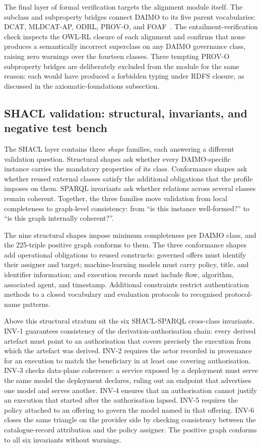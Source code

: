 \documentclass[Afour,sagev,times]{sagej}
\begin{document}
The final layer of formal verification targets the alignment module itself. The subclass and subproperty bridges connect DAIMO to its five parent vocabularies: DCAT, MLDCAT-AP, ODRL, PROV-O, and FOAF~\cite{foaf}. The entailment-verification check inspects the OWL-RL closure of each alignment and confirms that none produces a semantically incorrect superclass on any DAIMO governance class, raising zero warnings over the fourteen classes. Three tempting PROV-O subproperty bridges are deliberately excluded from the module for the same reason: each would have produced a forbidden typing under RDFS closure, as discussed in the axiomatic-foundations subsection.

\subsection{SHACL validation: structural, invariants, and negative test bench}\label{sec:eval-invariants}

The SHACL layer contains three \emph{shape} families, each answering a different validation question. Structural shapes ask whether every DAIMO-specific instance carries the mandatory properties of its class. Conformance shapes ask whether reused external classes satisfy the additional obligations that the profile imposes on them. SPARQL invariants ask whether relations across several classes remain coherent. Together, the three families move validation from local completeness to graph-level consistency: from ``is this instance well-formed?'' to ``is this graph internally coherent?''.

The nine structural shapes impose minimum completeness per DAIMO class, and the 225-triple positive graph conforms to them. The three conformance shapes add operational obligations to reused constructs: governed offers must identify their assigner and target; machine-learning models must carry policy, title, and identifier information; and execution records must include flow, algorithm, associated agent, and timestamp. Additional constraints restrict authentication methods to a closed vocabulary and evaluation protocols to recognised protocol-name patterns.

Above this structural stratum sit the six SHACL-SPARQL cross-class invariants. INV-1 guarantees consistency of the derivation-authorisation chain: every derived artefact must point to an authorisation that covers precisely the execution from which the artefact was derived. INV-2 requires the actor recorded in provenance for an execution to match the beneficiary in at least one covering authorisation. INV-3 checks data-plane coherence: a service exposed by a deployment must serve the same model the deployment declares, ruling out an endpoint that advertises one model and serves another. INV-4 ensures that an authorisation cannot justify an execution that started after the authorisation lapsed. INV-5 requires the policy attached to an offering to govern the model named in that offering. INV-6 closes the same triangle on the provider side by checking consistency between the catalogue-record attribution and the policy assigner. The positive graph conforms to all six invariants without warnings.
\end{document}
